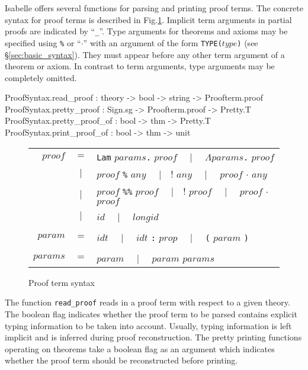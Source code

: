 Isabelle offers several functions for parsing and printing
proof terms. The concrete syntax for proof terms is described
in Fig.\ts\ref{fig:proof_gram}.
Implicit term arguments in partial proofs are indicated
by ``{\tt _}''.
Type arguments for theorems and axioms may be specified using
\verb!%! or ``$\cdot$'' with an argument of the form {\tt TYPE($type$)}
(see \S\ref{sec:basic_syntax}).
They must appear before any other term argument of a theorem
or axiom. In contrast to term arguments, type arguments may
be completely omitted.
\begin{ttbox}
ProofSyntax.read_proof : theory -> bool -> string -> Proofterm.proof
ProofSyntax.pretty_proof : Sign.sg -> Proofterm.proof -> Pretty.T
ProofSyntax.pretty_proof_of : bool -> thm -> Pretty.T
ProofSyntax.print_proof_of : bool -> thm -> unit
\end{ttbox}
\begin{figure}
\begin{center}
\begin{tabular}{rcl}
$proof$  & $=$ & {\tt Lam} $params${\tt .} $proof$ ~~$|$~~
                 $\Lambda params${\tt .} $proof$ \\
         & $|$ & $proof$ \verb!%! $any$ ~~$|$~~
                 $proof$ $\cdot$ $any$ \\
         & $|$ & $proof$ \verb!%%! $proof$ ~~$|$~~
                 $proof$ {\boldmath$\cdot$} $proof$ \\
         & $|$ & $id$ ~~$|$~~ $longid$ \\\\
$param$  & $=$ & $idt$ ~~$|$~~ $idt$ {\tt :} $prop$ ~~$|$~~
                 {\tt (} $param$ {\tt )} \\\\
$params$ & $=$ & $param$ ~~$|$~~ $param$ $params$
\end{tabular}
\end{center}
\caption{Proof term syntax}\label{fig:proof_gram}
\end{figure}
The function {\tt read_proof} reads in a proof term with
respect to a given theory. The boolean flag indicates whether
the proof term to be parsed contains explicit typing information
to be taken into account.
Usually, typing information is left implicit and
is inferred during proof reconstruction. The pretty printing
functions operating on theorems take a boolean flag as an
argument which indicates whether the proof term should
be reconstructed before printing.

